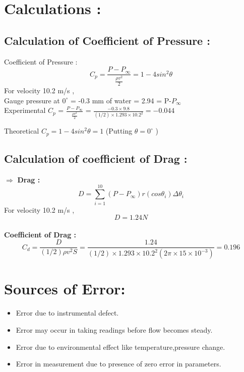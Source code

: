 \documentclass[12pt,a4paper]{article}
\begin{document}
\section{Calculations :}


\subsection{Calculation of Coefficient of Pressure :}
Coefficient of Pressure :
$$C_p = \frac{P - P_{\infty}}{\frac{\rho v^2}{2}} = 1 - 4 sin ^2{\theta}$$
For velocity 10.2 m/s , \\
Gauge pressure at $0^{\circ}$ = -0.3 mm of water = 2.94 = P-$P_{\infty}$\\
\vspace{2mm}
Experimental $C_p$ = $\frac{P - P_{\infty}}{\frac{\rho v^2}{2}}$ = $\frac{-0.3 \times 9.8}{(1/2)\times 1.293 \times 10.2^2} = -0.044 $



Theoretical $C_p =  1 - 4 sin ^2{\theta} = 1 $ (Putting $\theta = 0^{\circ}$ )\\


\subsection{Calculation of coefficient of Drag :}
 $\Rightarrow$ \textbf{Drag :}
\[ D = \sum_{i=1}^{10} (P-P_{\infty})r (cos\theta_i) \Delta\theta_i \] 
For velocity 10.2 m/s ,\\
$$ D = 1.24 N $$ \\
\textbf{Coefficient of Drag :}
$$ C_d = \frac{D}{(1/2)\rho v^2 S} = \frac{1.24}{(1/2)\times 1.293 \times 10.2^2 (2\pi \times 15 \times 10^{-3})} = 0.196
$$









\section{Sources of Error:}
\begin{itemize}
    \item Error due to instrumental defect.
    \item Error may occur in taking readings before flow becomes steady.
    \item Error due to environmental effect like temperature,pressure change.
    \item Error in measurement due to presence of zero error in parameters.
\end{itemize}
\end{document}
